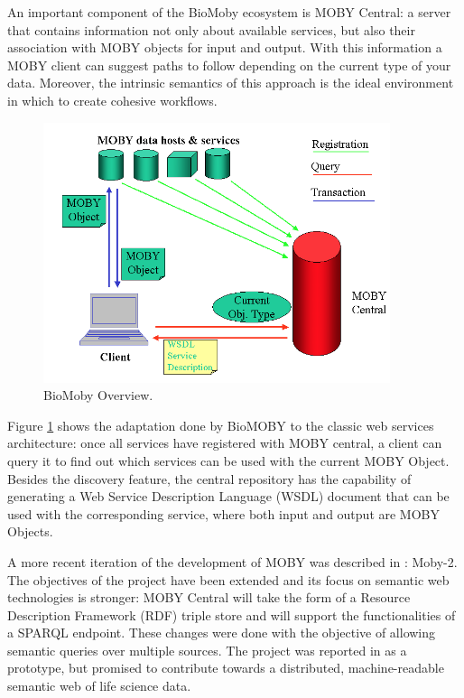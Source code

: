 An important component of the BioMoby ecosystem is MOBY Central: a server that contains information not only about available services, but also their association with MOBY objects for input and output. With this information a MOBY client can suggest paths to follow depending on the current type of your data. Moreover, the intrinsic semantics of this approach is the ideal environment in which to create cohesive workflows.

\begin{figure}  
\centering
\includegraphics[width=4in]{figures/MOBY_Overview.png}
\caption[BioMoby Overview.]{BioMoby Overview.
\label{fig:biomoby}}
\end{figure}

Figure \ref{fig:biomoby} shows the adaptation done by BioMOBY to the classic web services architecture: once all services have registered with MOBY central, a client can query it to find out which services can be used with the current MOBY Object. Besides the discovery feature, the central repository has the capability of generating a Web Service Description Language (WSDL) document that can be used with the corresponding service, where both input and output are MOBY Objects.

A more recent iteration of the development of MOBY was described in \cite{VAN2009}: Moby-2. The objectives of the project have been extended and its focus on semantic web technologies is stronger: MOBY Central will take the form of a Resource Description Framework (RDF) triple store and will support the functionalities of a SPARQL endpoint. These changes were done with the objective of allowing semantic queries over multiple sources. The project was reported in \cite{VAN2009} as a prototype, but promised to contribute towards a distributed, machine-readable semantic web of life science data.

